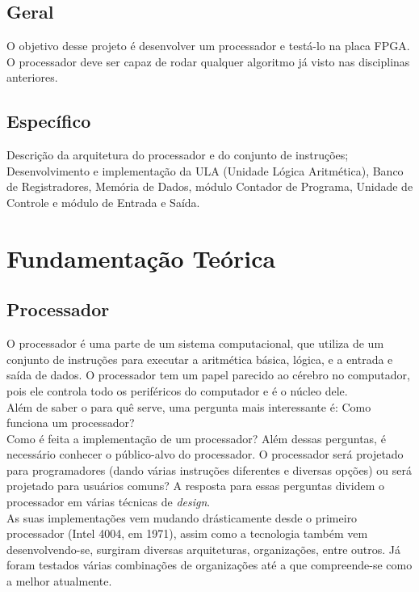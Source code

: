 \documentclass[
	12pt,
	openright,
	a4paper,
	english,			
	french,				
	spanish,			
	brazil,				
	]{abntex2}
\begin{document}
\section{Geral}
O objetivo desse projeto é desenvolver um processador e testá-lo na 
placa FPGA. O processador deve ser capaz de rodar qualquer algoritmo já visto nas disciplinas
anteriores.

\section{Específico}
Descrição da arquitetura do processador e do conjunto de instruções; 
Desenvolvimento e implementação da ULA (Unidade Lógica Aritmética), 
Banco de Registradores, Memória de Dados, módulo Contador de Programa, 
Unidade de Controle e módulo de Entrada e Saída.

\chapter{Fundamentação Teórica}
\section{Processador}
O processador é uma parte de um sistema computacional, que utiliza de um conjunto de instruções para executar a aritmética básica, lógica, e a entrada e saída de dados. O processador tem um papel parecido ao cérebro no computador, pois ele controla todo os periféricos do computador e é o núcleo dele.\\
Além de saber o para quê serve, uma pergunta mais interessante é: Como funciona um processador?\\
Como é feita a implementação de um processador? Além dessas perguntas, é necessário conhecer o público-alvo do processador. O processador será projetado para programadores (dando várias instruções diferentes e diversas opções) ou será projetado para usuários comuns?
A resposta para essas perguntas dividem o processador em várias técnicas de \textit{design}.\\
As suas implementações vem mudando drásticamente desde o primeiro processador (Intel 4004, em 1971), assim como a tecnologia também vem desenvolvendo-se, surgiram diversas arquiteturas, organizações, entre outros. Já foram testados várias combinações de organizações até a que compreende-se como a melhor atualmente.
\end{document}
